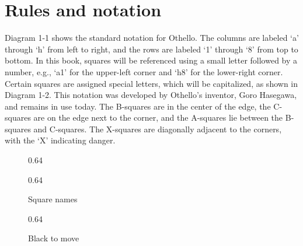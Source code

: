 \documentclass[a4paper,12pt]{book}
\newcommand{\scalefactorthreeup}{0.64}
\begin{document}
\chapter{Rules and notation}
Diagram 1-1 shows the standard notation for Othello. The columns are labeled
`a' through `h' from left to right, and the rows are labeled `1' through `8' from top to
bottom. In this book, squares will be referenced using a small letter followed by a
number, e.g., `a1' for the upper-left corner and `h8' for the lower-right corner. Certain
squares are assigned special letters, which will be capitalized, as shown in Diagram
1-2. This notation was developed by Othello's inventor, Goro Hasegawa, and remains
in use today. The B-squares are in the center of the edge, the C-squares are on
the edge next to the corner, and the A-squares lie between the B-squares and C-squares.
The X-squares are diagonally adjacent to the corners, with the `X' indicating
danger.
\begin{figure}[h]
\begin{center}
\begin{minipage}[t]{.32\textwidth}
\begin{othelloboard}{\scalefactorthreeup}
\end{othelloboard}
\caption{}
\end{minipage}
\hfill
\begin{minipage}[t]{.32\textwidth}
\begin{othelloboard}{\scalefactorthreeup}
\end{othelloboard}
\caption{Square names}
\end{minipage}
\hfill
\begin{minipage}[t]{.32\textwidth}
\begin{othelloboard}{\scalefactorthreeup}
\end{othelloboard}
\caption{Black to move}
\end{minipage}
\end{center}
\end{figure}
\end{document}

